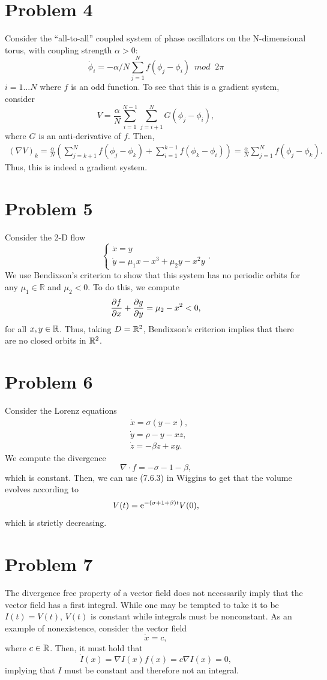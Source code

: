 \documentclass{article}
\begin{document}
\section{Problem 4}
Consider the ``all-to-all'' coupled system of phase oscillators on the N-dimensional torus, with coupling strength $\alpha>0$:
\begin{equation*}
	\dot \phi_i = - \alpha/N \sum_{j=1}^N f(\phi_j - \phi_i) \, \, \,  mod \; \; 2 \pi  
\end{equation*}
$i=1...N$ where $f$ is an odd function. To see that this is a gradient system, consider 
\[
V= \frac{\alpha}{N}\sum_{i=1}^{N-1} \sum_{j=i+1}^{N} G(\phi_j - \phi_i),
\]
where $G$ is an anti-derivative of $f$. Then,
\begin{align*}
\left(\nabla V\right)_k=\frac{\alpha}{N}\left(\sum_{j=k+1}^Nf(\phi_j-\phi_k)+\sum_{i=1}^{k-1}f(\phi_k-\phi_i)\right)=\frac{\alpha}{N}\sum_{j=1}^N f(\phi_j - \phi_k).
\end{align*}
Thus, this is indeed a gradient system.

\section{Problem 5}
Consider the 2-D flow
\begin{equation*}
	\left\{\begin{array}{l}
		\dot x = y \\
		\dot y = \mu_1 x - x^3 + \mu_2 y - x^2 y  
	\end{array}\right..
\end{equation*}
We use Bendixson's criterion to show that this system has no periodic orbits for any $\mu_1 \in \mathbb{R}$ and $\mu_2 < 0$. To do this, we compute
\[
\frac{\partial f}{\partial x}+\frac{\partial g}{\partial y}=\mu_2-x^2<0,
\]
for all $x,y\in\mathbb{R}$. Thus, taking $D=\mathbb{R}^2$, Bendixson's criterion implies that there are no closed orbits in $\mathbb{R}^2$.

\section{Problem 6}
Consider the Lorenz equations
\begin{align*}
&\dot x=\sigma(y-x),\\
&\dot y=\rho -y-xz,\\
&\dot z=-\beta z+xy.
\end{align*}
We compute the divergence
\[
\nabla\cdot f=-\sigma-1-\beta,
\]
which is constant. Then, we can use (7.6.3) in Wiggins to get that the volume evolves according to
\[
V(t)=\mathrm{e}^{-(\sigma+1+\beta)t}V(0),
\]
which is strictly decreasing.

\section{Problem 7}
The divergence free property of a vector field does not necessarily imply that the vector field has a first integral. While one may be tempted to take it to be $I(t)=V(t)$, $V(t)$ is constant while integrals must be nonconstant. As an example of nonexistence, consider the vector field 
\[
\dot x=c,
\]
where $c\in\mathbb{R}$. Then, it must hold that 
\[
\dot I(x)=\nabla I(x)f(x)=c\nabla I(x)=0,
\]
implying that $I$ must be constant and therefore not an integral.
\end{document}
